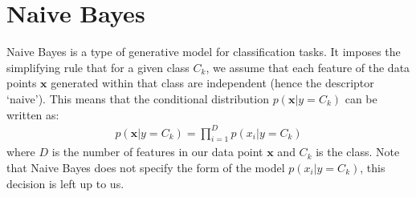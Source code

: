 \documentclass[12pt,letterpaper]{article}
\newenvironment{exercisesolution}
  {\begin{proof}[Solution]}
  {\end{proof}}
\begin{document}


\section{Naive Bayes}
	Naive Bayes is a type of generative model for classification tasks. It imposes the simplifying rule that for a given class $C_{k}$, we assume that each feature of the data points $\textbf{x}$ generated within that class are independent (hence the descriptor `naive'). This means that the conditional distribution $p(\textbf{x} | y = C_{k})$ can be written as:
	\begin{align*}
		p(\textbf{x} | y = C_{k}) = \prod_{i = 1}^{D} p(x_{i} | y = C_{k})
	\end{align*}
	where $D$ is the number of features in our data point $\textbf{x}$ and $C_{k}$ is the class. Note that Naive Bayes does not specify the form of the model $p(x_{i} | y = C_{k})$, this decision is left up to us.
 
\end{document}

